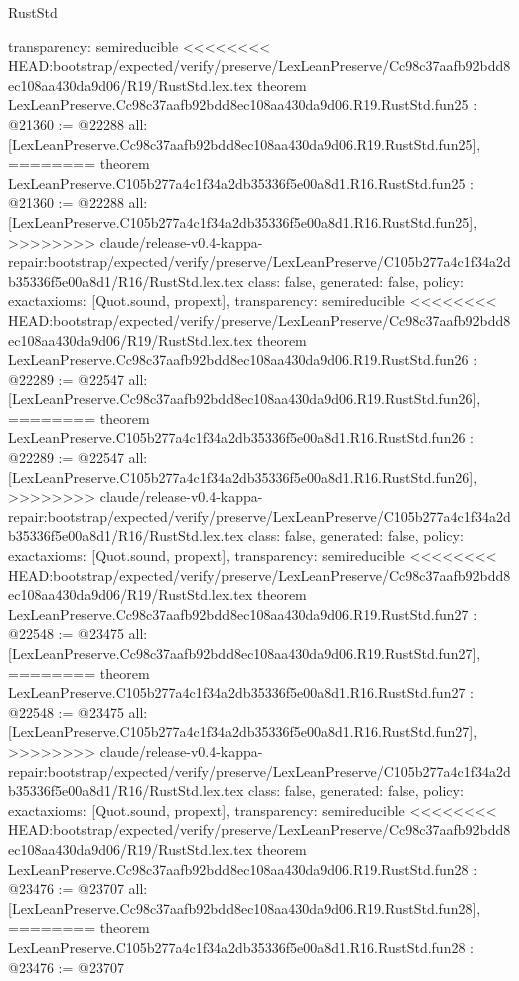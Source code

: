 \begin{lexlean}{RustStd}
\begin{coremodule}
{\begin{coremodule}
{{{{{{{{{{{{{{{{{{{{{{{{{{{{  transparency: semireducible
}
<<<<<<<< HEAD:bootstrap/expected/verify/preserve/LexLeanPreserve/Cc98c37aafb92bdd8ec108aa430da9d06/R19/RustStd.lex.tex
theorem LexLeanPreserve.Cc98c37aafb92bdd8ec108aa430da9d06.R19.RustStd.fun25 : @21360 := @22288 {
  all: [LexLeanPreserve.Cc98c37aafb92bdd8ec108aa430da9d06.R19.RustStd.fun25],
========
theorem LexLeanPreserve.C105b277a4c1f34a2db35336f5e00a8d1.R16.RustStd.fun25 : @21360 := @22288 {
  all: [LexLeanPreserve.C105b277a4c1f34a2db35336f5e00a8d1.R16.RustStd.fun25],
>>>>>>>> claude/release-v0.4-kappa-repair:bootstrap/expected/verify/preserve/LexLeanPreserve/C105b277a4c1f34a2db35336f5e00a8d1/R16/RustStd.lex.tex
  class: false,
  generated: false,
  policy: exact{axioms: [Quot.sound, propext]},
  transparency: semireducible
}
<<<<<<<< HEAD:bootstrap/expected/verify/preserve/LexLeanPreserve/Cc98c37aafb92bdd8ec108aa430da9d06/R19/RustStd.lex.tex
theorem LexLeanPreserve.Cc98c37aafb92bdd8ec108aa430da9d06.R19.RustStd.fun26 : @22289 := @22547 {
  all: [LexLeanPreserve.Cc98c37aafb92bdd8ec108aa430da9d06.R19.RustStd.fun26],
========
theorem LexLeanPreserve.C105b277a4c1f34a2db35336f5e00a8d1.R16.RustStd.fun26 : @22289 := @22547 {
  all: [LexLeanPreserve.C105b277a4c1f34a2db35336f5e00a8d1.R16.RustStd.fun26],
>>>>>>>> claude/release-v0.4-kappa-repair:bootstrap/expected/verify/preserve/LexLeanPreserve/C105b277a4c1f34a2db35336f5e00a8d1/R16/RustStd.lex.tex
  class: false,
  generated: false,
  policy: exact{axioms: [Quot.sound, propext]},
  transparency: semireducible
}
<<<<<<<< HEAD:bootstrap/expected/verify/preserve/LexLeanPreserve/Cc98c37aafb92bdd8ec108aa430da9d06/R19/RustStd.lex.tex
theorem LexLeanPreserve.Cc98c37aafb92bdd8ec108aa430da9d06.R19.RustStd.fun27 : @22548 := @23475 {
  all: [LexLeanPreserve.Cc98c37aafb92bdd8ec108aa430da9d06.R19.RustStd.fun27],
========
theorem LexLeanPreserve.C105b277a4c1f34a2db35336f5e00a8d1.R16.RustStd.fun27 : @22548 := @23475 {
  all: [LexLeanPreserve.C105b277a4c1f34a2db35336f5e00a8d1.R16.RustStd.fun27],
>>>>>>>> claude/release-v0.4-kappa-repair:bootstrap/expected/verify/preserve/LexLeanPreserve/C105b277a4c1f34a2db35336f5e00a8d1/R16/RustStd.lex.tex
  class: false,
  generated: false,
  policy: exact{axioms: [Quot.sound, propext]},
  transparency: semireducible
}
<<<<<<<< HEAD:bootstrap/expected/verify/preserve/LexLeanPreserve/Cc98c37aafb92bdd8ec108aa430da9d06/R19/RustStd.lex.tex
theorem LexLeanPreserve.Cc98c37aafb92bdd8ec108aa430da9d06.R19.RustStd.fun28 : @23476 := @23707 {
  all: [LexLeanPreserve.Cc98c37aafb92bdd8ec108aa430da9d06.R19.RustStd.fun28],
========
theorem LexLeanPreserve.C105b277a4c1f34a2db35336f5e00a8d1.R16.RustStd.fun28 : @23476 := @23707 {
}}}}}}}}}}}}}}}}}}}}}}}}}}}}}}}}
\end{coremodule}}
\end{coremodule}
\end{lexlean}
